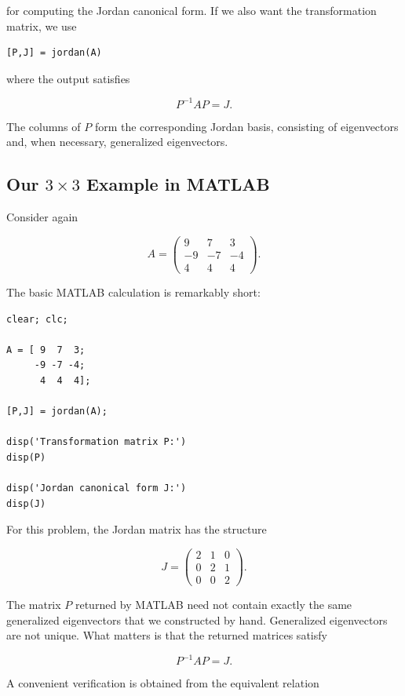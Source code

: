\documentclass[11pt]{article}
\begin{document}
for computing the Jordan canonical form.  If we also want the
transformation matrix, we use

\begin{verbatim}
[P,J] = jordan(A)
\end{verbatim}

where the output satisfies

\[
\boxed{
P^{-1}AP=J.
}
\]

The columns of \(P\) form the corresponding Jordan basis, consisting
of eigenvectors and, when necessary, generalized eigenvectors.


\subsection{Our \(3\times3\) Example in MATLAB}

Consider again

\[
A=
\begin{pmatrix}
9&7&3\\
-9&-7&-4\\
4&4&4
\end{pmatrix}.
\]

The basic MATLAB calculation is remarkably short:

\begin{verbatim}
clear; clc;

A = [ 9  7  3;
     -9 -7 -4;
      4  4  4];

[P,J] = jordan(A);

disp('Transformation matrix P:')
disp(P)

disp('Jordan canonical form J:')
disp(J)
\end{verbatim}

For this problem, the Jordan matrix has the structure

\[
\boxed{
J=
\begin{pmatrix}
2&1&0\\
0&2&1\\
0&0&2
\end{pmatrix}.
}
\]

The matrix \(P\) returned by MATLAB need not contain exactly the same
generalized eigenvectors that we constructed by hand.  Generalized
eigenvectors are not unique.  What matters is that the returned
matrices satisfy

\[
\boxed{
P^{-1}AP=J.
}
\]

A convenient verification is obtained from the equivalent relation
\end{document}
